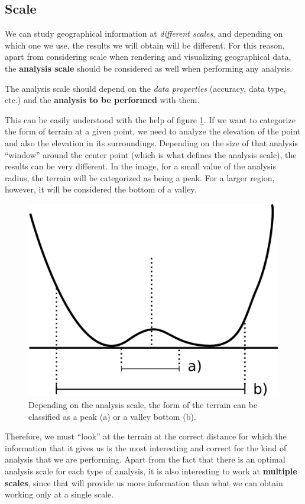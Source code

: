 \subsection{Scale}

We can study geographical information at \emph{different scales}, and depending on which one we use, the results we will obtain will be different. For this reason, apart from considering scale when rendering and visualizing geographical data, the \textbf{analysis scale} should be considered as well when performing any analysis.

The analysis scale should depend on the \emph{data properties} (accuracy, data type, etc.) and the \textbf{analysis to be performed} with them.

This can be easily understood with the help of figure \ref{Fig:Scales}. If we want to categorize the form of terrain at a given point, we need to analyze the elevation of the point and also the elevation in its surroundings. Depending on the size of that analysis ``window'' around the center point (which is what defines the analysis scale), the results can be very different. In the image, for a small value of the analysis radius, the terrain will be categorized as being a peak. For a larger region, however, it will be considered the bottom of a valley.

\begin{figure}[h]   
\centering
\includegraphics[width= .45\columnwidth]{Analysis/Scales.pdf}
\caption{\small Depending on the analysis scale, the form of the terrain can   be classified as a peak (a) or a valley bottom (b).}
\label{Fig:Scales} 
\end{figure}

Therefore, we must ``look'' at the terrain at the correct distance for which the information that it gives us is the most interesting and correct for the kind of analysis that we are performing. Apart from the fact that there is an optimal analysis scale for each type of analysis, it is also interesting to work at \textbf{multiple scales}, since that will provide us more information than what we can obtain working only at a single scale.

